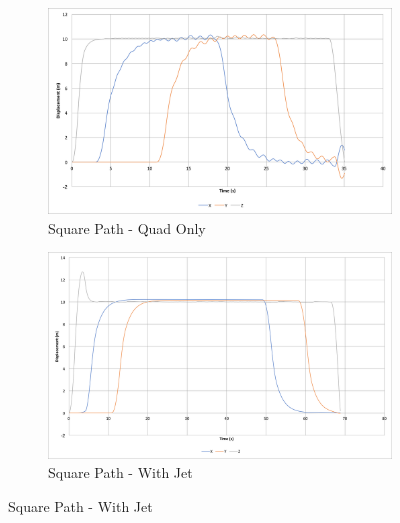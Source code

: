 \documentclass[11pt]{article}
\begin{document}
\begin{figure}[p]
    \centering
    \begin{subfigure}{0.72\textwidth}
        \includegraphics[width=\textwidth]{square_path_quad_only}
        \caption{Square Path - Quad Only}
        \label{fig:square_path_quad_only}
    \end{subfigure}

    \begin{subfigure}{0.72\textwidth}
        \includegraphics[width=\textwidth]{square_path_w_jet}
        \caption{Square Path - With Jet}
        \label{fig:square_path_w_jet}
    \end{subfigure}


\end{figure}
\end{document}
